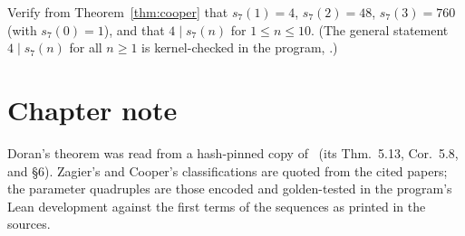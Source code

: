\begin{exercise}
Verify from Theorem~\ref{thm:cooper} that $s_7(1)=4$, $s_7(2)=48$,
$s_7(3)=760$ (with $s_7(0)=1$), and that $4\mid s_7(n)$ for $1\le n\le 10$.
(The general statement $4\mid s_7(n)$ for all $n\ge1$ is kernel-checked in the
program, .)
\end{exercise}

\section*{Chapter note}

Doran's theorem was read from a hash-pinned copy of~\cite{Doran2000} (its
Thm.~5.13, Cor.~5.8, and \S6). Zagier's and Cooper's classifications are
quoted from the cited papers; the parameter quadruples are those encoded and
golden-tested in the program's Lean development against the first terms of
the sequences as printed in the sources.
